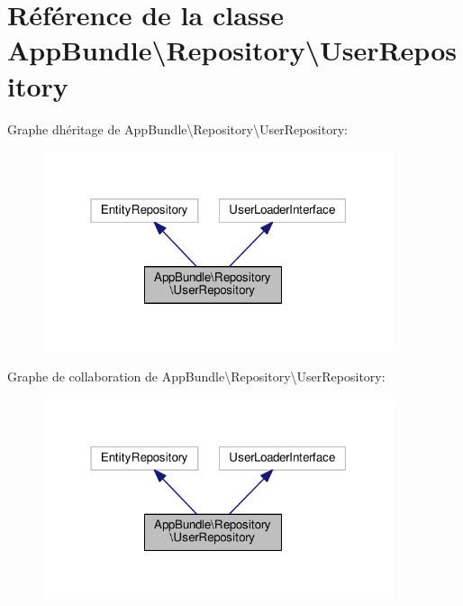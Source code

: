 \hypertarget{classAppBundle_1_1Repository_1_1UserRepository}{}\section{Référence de la classe App\+Bundle\textbackslash{}Repository\textbackslash{}User\+Repository}
\label{classAppBundle_1_1Repository_1_1UserRepository}


Graphe d\textquotesingle{}héritage de App\+Bundle\textbackslash{}Repository\textbackslash{}User\+Repository\+:\nopagebreak
\begin{figure}[H]
\begin{center}
\leavevmode
\includegraphics[width=292pt]{classAppBundle_1_1Repository_1_1UserRepository__inherit__graph}
\end{center}
\end{figure}


Graphe de collaboration de App\+Bundle\textbackslash{}Repository\textbackslash{}User\+Repository\+:\nopagebreak
\begin{figure}[H]
\begin{center}
\leavevmode
\includegraphics[width=292pt]{classAppBundle_1_1Repository_1_1UserRepository__coll__graph}
\end{center}
\end{figure}
